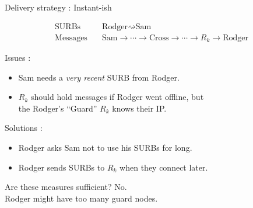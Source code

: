 \documentclass[fleqn,xcolor={usenames,dvipsnames}]{beamer}
\begin{document}
\begin{frame}[t]{Delivery strategy : Instant-ish }

\[ \begin{aligned}
\textrm{SURBs}\quad & \textrm{Rodger} \rightsquigarrow \textrm{Sam} \\
\textrm{Messages}\quad & \textrm{Sam} \to \cdots \to \textrm{Cross} \to \cdots \to R_k \to \textrm{Rodger}
\end{aligned} \]

Issues :
\begin{itemize}
\item Sam needs a {\em very recent} SURB from Rodger.  
\item $R_k$ should hold messages if Rodger went offline, but \\ 
 \hspace*{2pt} the Rodger's ``Guard'' $R_k$ knows their IP. \\
\end{itemize}


Solutions : 
\begin{itemize}
\item Rodger asks Sam not to use his SURBs for long. \\
\item Rodger sends SURBs to $R_k$ when they connect later.
\end{itemize}

\bigskip
Are these measures sufficient?  No. \\
 \hspace*{2pt} Rodger might have too many guard nodes.

\end{frame}
\end{document}
